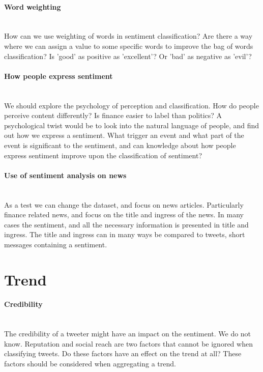 \paragraph{Word weighting}
\hspace{0pt}\\
How can we use weighting of words in sentiment classification? Are there a way
where we can assign a value to some specific words to improve the bag of words
classification? Is 'good' as positive as 'excellent'? Or 'bad' as negative as
'evil'? 

\paragraph{How people express sentiment}
\hspace{0pt}\\
We should explore the psychology of perception and classification. How do
people perceive content differently? Is finance easier to label than politics?
A psychological twist would be to look into the natural language of people,
and find out how we express a sentiment. What trigger an event and what part
of the event is significant to the sentiment, and can knowledge about how
people express sentiment improve upon the classification of sentiment? 

\paragraph{Use of sentiment analysis on news}
\hspace{0pt}\\
As a test we can change the dataset, and focus on news articles. Particularly
finance related news, and focus on the title and ingress of the news. In many
cases the sentiment, and all the necessary information is presented in title
and ingress. The title and ingress can in many ways be compared to tweets,
short messages containing a sentiment.
%

\section{Trend}\label{future_work:trend}
\paragraph{Credibility}
\hspace{0pt}\\
The credibility of a tweeter might have an impact on the sentiment. We do not
know. Reputation and social reach are two factors that cannot be ignored when 
classifying tweets. Do these factors have an effect on the trend at all? These
factors should be considered when aggregating a trend. 

